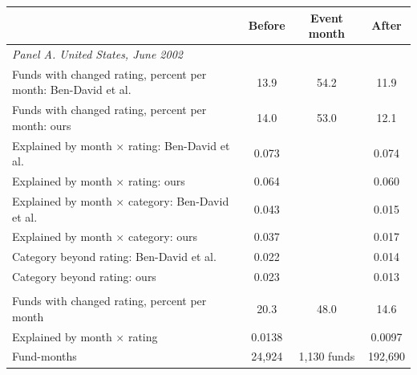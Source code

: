 \begin{tabular}{lccc}
\toprule
 & Before & Event month & After \\
\midrule
\multicolumn{4}{l}{\textit{Panel A. United States, June 2002}} \\
Funds with changed rating, percent per month: Ben-David et al. & 13.9 & 54.2 & 11.9 \\
Funds with changed rating, percent per month: ours & 14.0 & 53.0 & 12.1 \\
Explained by month $\times$ rating: Ben-David et al. & 0.073 & & 0.074 \\
Explained by month $\times$ rating: ours & 0.064 & & 0.060 \\
Explained by month $\times$ category: Ben-David et al. & 0.043 & & 0.015 \\
Explained by month $\times$ category: ours & 0.037 & & 0.017 \\
Category beyond rating: Ben-David et al. & 0.022 & & 0.014 \\
Category beyond rating: ours & 0.023 & & 0.013 \\
\addlinespace
\multicolumn{4}{l}{\textit{Panel B. Europe, October 2006}} \\
Funds with changed rating, percent per month & 20.3 & 48.0 & 14.6 \\
Explained by month $\times$ rating & 0.0138 & & 0.0097 \\
Fund-months & 24,924 & 1,130 funds & 192,690 \\
\bottomrule
\end{tabular}

